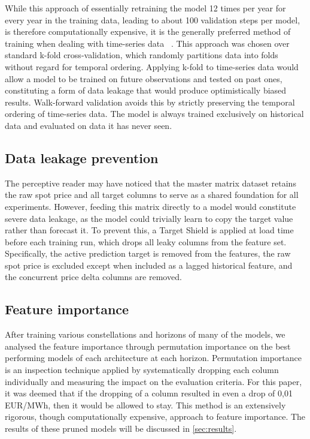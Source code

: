 While this approach of essentially retraining the model 12 times per
year for every year in the training data, leading to about 100
validation steps per model, is therefore computationally
expensive, it is the generally preferred method of training when
dealing with time-series data ~\cite{tashmanWalkForward}. This approach was 
chosen over standard k-fold cross-validation, which randomly partitions
data into folds without regard for temporal ordering. Applying
k-fold to time-series data would allow a model to be trained on
future observations and tested on past ones, constituting a form
of data leakage that would produce optimistically biased results.
Walk-forward validation avoids this by strictly preserving the
temporal ordering of time-series data. The model is always
trained exclusively on historical data and evaluated on data it
has never seen. 

\subsection{Data leakage prevention}
The perceptive reader may have noticed that the master matrix dataset retains 
the raw spot price and all target columns to serve as a shared foundation for 
all experiments. However, feeding this matrix directly to a model would 
constitute severe data leakage, as the model could trivially learn to copy the 
target value rather than forecast it. To prevent this, a Target Shield is 
applied at load time before each training run, which drops all leaky columns 
from the feature set. Specifically, the active prediction target is removed 
from the features, the raw spot price is excluded except when included as a 
lagged historical feature, and the concurrent price delta columns are removed. 

\subsection{Feature importance}
After training various constellations and horizons of many
of the models, we analysed the feature importance through
permutation importance on the best performing models of
each architecture at each horizon. Permutation importance is
an inspection technique applied by systematically dropping
each column individually and measuring the impact on the
evaluation criteria. For this paper, it was deemed that if
the dropping of a column resulted in even a drop of 0,01
EUR/MWh, then it would be allowed to stay. This method
is an extensively rigorous, though computationally expensive,
approach to feature importance. The results of these pruned
models will be discussed in \autoref{sec:results}.

